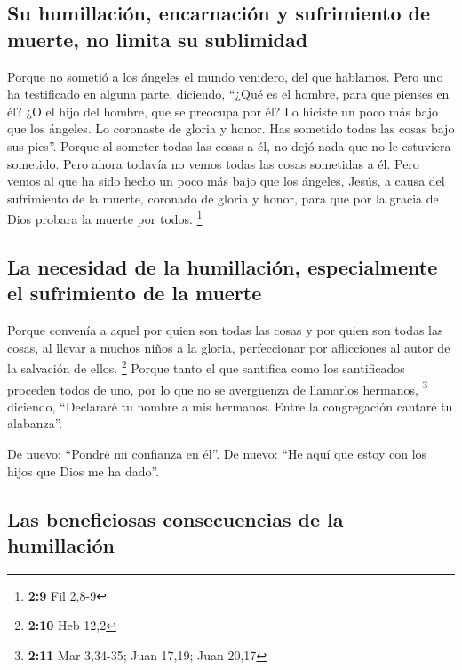 \hypertarget{su-humillaciuxf3n-encarnaciuxf3n-y-sufrimiento-de-muerte-no-limita-su-sublimidad}{%
\subsection{Su humillación, encarnación y sufrimiento de muerte, no
limita su
sublimidad}\label{su-humillaciuxf3n-encarnaciuxf3n-y-sufrimiento-de-muerte-no-limita-su-sublimidad}}

 Porque no sometió a los ángeles el mundo venidero, del
que hablamos.  Pero uno ha testificado en alguna parte,
diciendo, ``¿Qué es el hombre, para que pienses en él? ¿O el hijo del
hombre, que se preocupa por él?  Lo hiciste un poco más
bajo que los ángeles. Lo coronaste de gloria y honor.  Has
sometido todas las cosas bajo sus pies''. Porque al someter todas las
cosas a él, no dejó nada que no le estuviera sometido. Pero ahora
todavía no vemos todas las cosas sometidas a él.  Pero
vemos al que ha sido hecho un poco más bajo que los ángeles, Jesús, a
causa del sufrimiento de la muerte, coronado de gloria y honor, para que
por la gracia de Dios probara la muerte por todos. \footnote{\textbf{2:9}
  Fil 2,8-9}

\hypertarget{la-necesidad-de-la-humillaciuxf3n-especialmente-el-sufrimiento-de-la-muerte}{%
\subsection{La necesidad de la humillación, especialmente el sufrimiento
de la
muerte}\label{la-necesidad-de-la-humillaciuxf3n-especialmente-el-sufrimiento-de-la-muerte}}

 Porque convenía a aquel por quien son todas las cosas y
por quien son todas las cosas, al llevar a muchos niños a la gloria,
perfeccionar por aflicciones al autor de la salvación de ellos.
\footnote{\textbf{2:10} Heb 12,2}  Porque tanto el que
santifica como los santificados proceden todos de uno, por lo que no se
avergüenza de llamarlos hermanos, \footnote{\textbf{2:11} Mar 3,34-35;
  Juan 17,19; Juan 20,17}  diciendo, ``Declararé tu
nombre a mis hermanos. Entre la congregación cantaré tu alabanza''.

 De nuevo: ``Pondré mi confianza en él''. De nuevo: ``He
aquí que estoy con los hijos que Dios me ha dado''.

\hypertarget{las-beneficiosas-consecuencias-de-la-humillaciuxf3n}{%
\subsection{Las beneficiosas consecuencias de la
humillación}\label{las-beneficiosas-consecuencias-de-la-humillaciuxf3n}}

